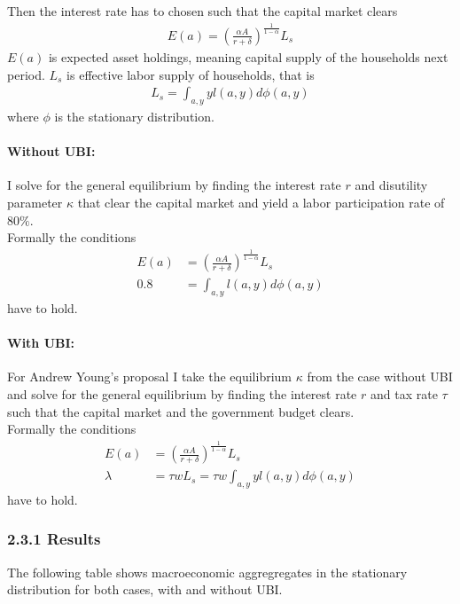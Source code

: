 \documentclass[letterpaper,12pt]{article}
\begin{document}
Then the interest rate has to chosen such that the capital market clears
\begin{align*}
E(a) = \left( \frac{\alpha A}{r + \delta} \right)^{\frac{1}{1-\alpha}} L_s
\end{align*}
$E(a)$ is expected asset holdings, meaning capital supply of the households next period. $L_s$ is effective labor supply of households, that is 
\begin{align*}
L_s = \int_{a,y} y l(a,y) d\phi(a,y)
\end{align*}
where $\phi$ is the stationary distribution. 

\paragraph{Without UBI: } I solve for the general equilibrium by finding the interest rate $r$ and disutility parameter $\kappa$ that clear the capital market and yield a labor participation rate of $80\%$. \\
Formally the conditions
\begin{align*}
E(a) &= \left( \frac{\alpha A}{r + \delta} \right)^{\frac{1}{1-\alpha}} L_s \\ 
0.8 &= \int_{a,y} l(a,y) d\phi(a,y)
\end{align*}
have to hold. \\

\paragraph{With UBI: } For Andrew Young's proposal I take the equilibrium $\kappa$ from the case without UBI and solve for the general equilibrium by finding the interest rate $r$ and tax rate $\tau$ such that the capital market and the government budget clears. \\
Formally the conditions
\begin{align*}
E(a) &= \left( \frac{\alpha A}{r + \delta} \right)^{\frac{1}{1-\alpha}} L_s \\ 
\lambda &= \tau w L_s = \tau w \int_{a,y} y l(a,y) d\phi(a,y)
\end{align*}
have to hold. \\


\subsubsection*{2.3.1 Results}
The following table shows macroeconomic aggregregates in the stationary distribution for both cases, with and without UBI.
 
\end{document}

